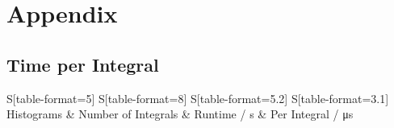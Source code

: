 

\renewcommand\thechapter{A}
\chapter{Appendix}

\section*{Time per Integral}
\begin{table}
	\centering
	\begin{tabular}{ 
			S[table-format=5]
			S[table-format=8]
			S[table-format=5.2]
			S[table-format=3.1]
			}
		\toprule
		{Histograms} & {Number of Integrals} & {Runtime / \si{\second}} & {Per Integral / \si{\micro\second}} \\
		\midrule
		

\end{tabular}
\end{table}
